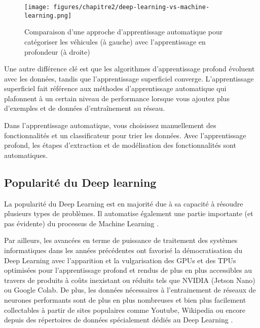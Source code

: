     \begin{figure}[H]
    	\begin{center}
    		\texttt{[image: figures/chapitre2/deep-learning-vs-machine-learning.png]}
    	\end{center}
    	\caption {Comparaison d'une approche d'apprentissage automatique pour catégoriser les véhicules (à gauche) avec l'apprentissage en profondeur (à droite)  \cite{ch2ref14}}
    	\label{fig:fig2ch2}
    \end{figure}
    
    \par Une autre différence clé est que les algorithmes d’apprentissage profond évoluent avec les données, tandis que l’apprentissage superficiel converge. L’apprentissage superficiel fait référence aux méthodes d’apprentissage automatique qui plafonnent à un certain niveau de performance lorsque vous ajoutez plus d’exemples et de données d’entraînement au réseau. 
    
    \par Dans l’apprentissage automatique, vous choisissez manuellement des fonctionnalités et un classificateur pour trier les données. Avec l’apprentissage profond, les étapes d’extraction et de modélisation des fonctionnalités sont automatiques.
    
    \subsection{Popularité du Deep learning  }
    \par La popularité du Deep Learning est en majorité due à sa capacité à résoudre plusieurs types de problèmes. Il automatise également une partie importante (et pas évidente) du processus de Machine Learning \cite{ch2ref12,ch2ref1,ch2ref2}.
    
    \par Par ailleurs, les avancées en terme de puissance de traitement des systèmes informatiques dans les années précédentes ont favorisé la démocratisation du Deep Learning avec l’apparition et la vulgarisation des GPUs et des TPUs optimisées pour l'apprentissage profond et rendus de plus en plus accessibles au travers de produits à coûts inexistant ou réduits tels que NVIDIA (Jetson Nano) ou Google Colab. De plus, les données nécessaires à l’entrainement de réseaux de neurones performants sont de plus en plus nombreuses et bien plus facilement collectables à partir de sites populaires comme Youtube, Wikipedia ou encore depuis des répertoires de données spécialement dédiés au Deep Learning \cite{ch2ref12,ch2ref1,ch2ref2}. 
    
